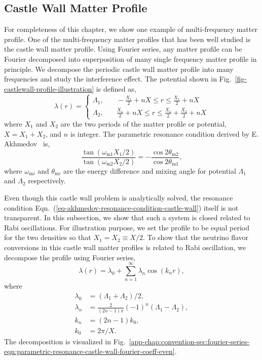 \subsection{Castle Wall Matter Profile}



For completeness of this chapter, we show one example of multi-frequency matter profile. One of the multi-frequency matter profiles that has been well studied is the castle wall matter profile. Using Fourier series, any matter profile can be Fourier decomposed into superposition of many single frequency matter profile in principle. We decompose the periodic castle wall matter profile into many frequencies and study the interference effect. The potential shown in Fig.~\ref{fig-castlewall-profile-illustration} is defined as,
\begin{equation}
    \lambda(r) = \begin{cases}
\Lambda_1, &\quad -\frac{X_1}{2}+nX\le r\le \frac{X_1}{2}+nX \\
\Lambda_2, &\quad \frac{X_1}{2}+nX\le r\le \frac{X_1}{2}+\frac{X_2}{2} +nX
\end{cases}
\label{eq-castle-wall-potential}
\end{equation}
where $X_1$ and $X_2$ are the two periods of the matter profile or potential, $X=X_1+X_2$, and $n$ is integer. The parametric resonance condition derived by E. Akhmedov~\cite{Akhmedov2000} is,
\begin{equation}
    \frac{\tan (\omega_{\mathrm m1}X_1/2)}{\tan (\omega_{\mathrm m2}X_2/2)} = - \frac{\cos 2\theta_{\mathrm m2}}{\cos 2\theta_{\mathrm m1}},
    \label{eq-akhmedov-resonance-condition-castle-wall}
\end{equation}
where $\omega_{\mathrm{m}i}$ and $\theta_{\mathrm{m}i}$ are the energy difference and mixing angle for potential $\Lambda_1$ and $\Lambda_2$ respectively.

Even though this castle wall problem is analytically solved, the resonance condition Eqn.~(\ref{eq-akhmedov-resonance-condition-castle-wall}) itself is not transparent. In this subsection, we show that such a system is closed related to Rabi oscillations. For illustration purpose, we set the profile to be equal period for the two densities so that $X_1=X_2\equiv X/2$. To show that the neutrino flavor conversions in this castle wall matter profiles is related to Rabi oscillation, we decompose the profile using Fourier series,
\begin{equation}
\lambda(r) = \lambda_0 + \sum_{n=1}^{\infty} \lambda_n \cos\left( k_n  r \right),
\label{eq-castle-wall-fourier-expanded}
\end{equation}
where
\begin{align*}
\lambda_0 &= (\Lambda_1 + \Lambda_2)/2, \\
\lambda_n & = \frac{2}{(2n-1)\pi}  (-1)^n  \left( \Lambda_1 -  \Lambda_2 \right),\\
k_n &= (2n-1)k_0, \\
k_0 &= 2\pi/X.
\end{align*}
The decomposition is visualized in Fig.~\ref{app-chap:convention-sec:fourier-series-eqn:parametric-resonance-castle-wall-fourier-coeff-even}.

